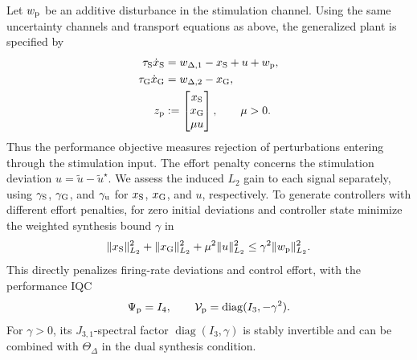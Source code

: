 Let $w_{{\mathrm{p}}}$ be an additive disturbance in the stimulation channel.
Using the same uncertainty channels and transport equations as above,
the generalized plant is specified by
\begin{equation}\label{eq:stn-gpe-generalized-plant}
\begin{aligned}
\tau_{{\mathrm{S}}}\dot{x}_{{\mathrm{S}}}
    &=w_{\Delta,1}-x_{{\mathrm{S}}}+u+w_{{\mathrm{p}}},\\
\tau_{{\mathrm{G}}}\dot{x}_{{\mathrm{G}}}
    &=w_{\Delta,2}-x_{{\mathrm{G}}},\\
z_{{\mathrm{p}}}&:=\begin{bmatrix}x_{{\mathrm{S}}}\\x_{{\mathrm{G}}}\\\mu u\end{bmatrix},\qquad\mu>0.
\end{aligned}
\end{equation}
Thus the performance objective measures rejection of perturbations
entering through the stimulation input. The effort penalty concerns
the stimulation deviation $u=\tilde u-\tilde u^\star$.
We assess the induced $L_2$ gain to each signal separately, using
$\gamma_{{\mathrm{S}}}$, $\gamma_{{\mathrm{G}}}$, and $\gamma_{{\mathrm{u}}}$ for
$x_{{\mathrm{S}}}$, $x_{{\mathrm{G}}}$, and $u$, respectively.
To generate controllers with different effort penalties, for zero
initial deviations and controller state minimize the weighted synthesis
bound $\gamma$ in
\begin{equation}\label{eq:stn-gpe-performance-bound}
\|x_{{\mathrm{S}}}\|_{L_2}^2+\|x_{{\mathrm{G}}}\|_{L_2}^2
+\mu^2\|u\|_{L_2}^2\leq\gamma^2\|w_{{\mathrm{p}}}\|_{L_2}^2.
\end{equation}
This directly penalizes firing-rate deviations and control effort,
with the performance IQC
\begin{equation}\label{eq:stn-gpe-performance-filter}
\Psi_{{\mathrm{p}}}=I_4,\qquad
\mathcal{V}_{{\mathrm{p}}}=\operatorname{diag}(I_3,-\gamma^2).
\end{equation}
For $\gamma>0$, its $J_{3,1}$-spectral factor
$\operatorname{diag}(I_3,\gamma)$ is stably invertible and can be combined
with $\Theta_\Delta$ in the dual synthesis condition.

